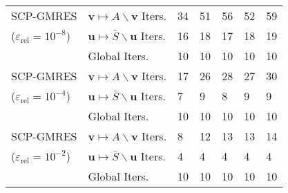 \begin{tabular}{lllllll}
SCP-GMRES & $\boldsymbol{v}\mapsto A\backslash \boldsymbol{v}$ Iters. & 34 & 51 & 56 & 52 & 59 \\
($\varepsilon_\mathrm{rel}=10^{-8}$) & $\boldsymbol{u}\mapsto \bar{S}\backslash \boldsymbol{u}$ Iters. & 16 & 18 & 17 & 18 & 19 \\
 & Global Iters. & 10 & 10 & 10 & 10 & 10 \\\cline{2-7}
SCP-GMRES & $\boldsymbol{v}\mapsto A\backslash \boldsymbol{v}$ Iters. & 17 & 26 & 28 & 27 & 30 \\
($\varepsilon_\mathrm{rel}=10^{-4}$) & $\boldsymbol{u}\mapsto \bar{S}\backslash \boldsymbol{u}$ Iters. & 7 & 9 & 8 & 9 & 9 \\
 & Global Iters. & 10 & 10 & 10 & 10 & 10 \\\cline{2-7}
SCP-GMRES & $\boldsymbol{v}\mapsto A\backslash \boldsymbol{v}$ Iters. & 8 & 12 & 13 & 13 & 14 \\
($\varepsilon_\mathrm{rel}=10^{-2}$) & $\boldsymbol{u}\mapsto \bar{S}\backslash \boldsymbol{u}$ Iters. & 4 & 4 & 4 & 4 & 4 \\
 & Global Iters. & 10 & 10 & 10 & 10 & 10 \\\hline 
\end{tabular}


